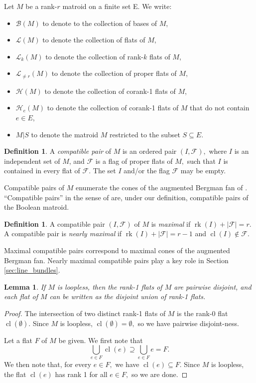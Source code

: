 \documentclass{amsart}
\theoremstyle{plain}
\newtheorem{lemma}[theorem]{Lemma}
\theoremstyle{definition}
\newtheorem{definition}[theorem]{Definition}
\newcommand{\rk}{\operatorname{rk}}
\newcommand{\cl}{\operatorname{cl}}
\begin{document}
Let $M$ be a rank-$r$ matroid on a finite set E. We write:
\begin{itemize}
    \item $\mathcal{B}(M)$ to denote to the collection of bases of $M$,
    \item $\mathcal{L}(M)$ to denote the collection of flats of $M$,
    \item $\mathcal{L}_k(M)$ to denote the collection of rank-$k$ flats of $M$,
    \item $\mathcal{L}_{\neq r}(M)$ to denote the collection of proper flats of $M$,
    \item $\mathcal{H}(M)$ to denote the collection of corank-1 flats of $M$,
    \item $\mathcal{H}_e(M)$ to denote the collection of corank-1 flats of $M$ that do not contain $e \in E$,
    \item $M | S$ to denote the matroid $M$ restricted to the subset $S \subseteq E.$
\end{itemize}

\begin{definition}
A \textit{compatible pair} of $M$ is an ordered pair $(I, \mathscr{F}),$ where $I$ is an independent set of $M$, and $\mathscr{F}$ is a flag of proper flats of $M,$ such that $I$ is contained in every flat of $\mathscr{F}.$ The set $I$ and/or the flag $\mathscr{F}$ may be empty.
\end{definition}

Compatible pairs of $M$ enumerate the cones of the augmented Bergman fan of \cite{semismall}. ``Compatible pairs'' in the sense of \cite{semismall} are, under our definition, compatible pairs of the Boolean matroid.

\begin{definition}
A compatible pair $(I, \mathscr{F})$ of $M$ is \textit{maximal} if $\rk(I) + |\mathscr{F}| = r.$ A compatible pair is \textit{nearly maximal} if $\rk(I) + |\mathscr{F}| = r - 1$ and $\cl(I) \notin \mathscr{F}.$
\end{definition}

Maximal compatible pairs correspond to maximal cones of the augmented Bergman fan. Nearly maximal compatible pairs play a key role in Section \ref{sec:line_bundles}.

\begin{lemma}
\label{lem:flat_disjoint_union}
If $M$ is loopless, then the rank-1 flats of $M$ are pairwise disjoint, and each flat of $M$ can be written as the disjoint union of rank-1 flats.
\end{lemma}
\begin{proof}
The intersection of two distinct rank-1 flats of $M$ is the rank-0 flat $\cl(\emptyset).$ Since $M$ is loopless, $\cl(\emptyset) = \emptyset,$ so we have pairwise disjoint-ness.

Let a flat $F$ of $M$ be given. We first note that
\[\bigcup_{e \in F} \cl(e) \supseteq \bigcup_{e \in F} e = F.\]
We then note that, for every $e \in F,$ we have $\cl(e) \subseteq F.$ Since $M$ is loopless, the flat $\cl(e)$ has rank 1 for all $e \in F,$ so we are done.
\end{proof}
\end{document}
